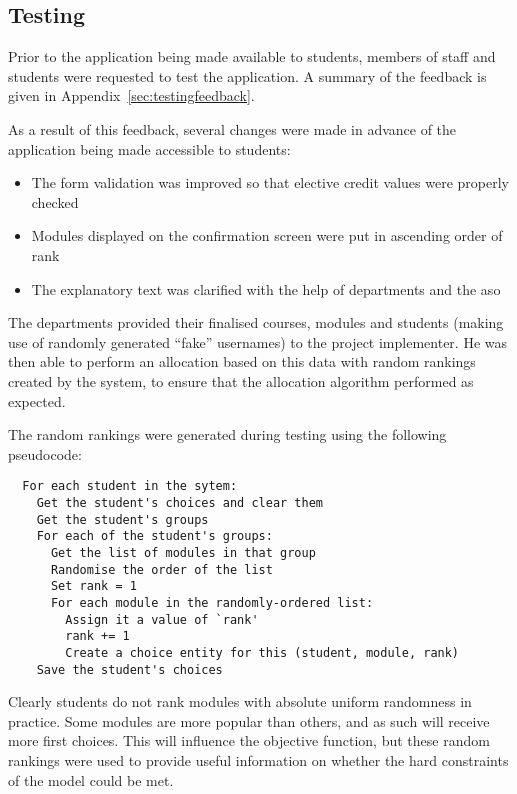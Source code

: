 
\subsection{Testing}



Prior to the application being made available to students, members of staff
and students were requested to test the application. A summary of the feedback
is given in Appendix~\ref{sec:testingfeedback}.

As a result of this feedback, several changes were made in advance of the
application being made accessible to students:

\begin{itemize}
  \item The form validation was improved so that elective credit values were properly checked
  \item Modules displayed on the confirmation screen were put in ascending order of rank
  \item The explanatory text was clarified with the help of departments and the \gls{aso}
\end{itemize}


The departments provided their finalised courses, modules and students (making
use of randomly generated ``fake'' usernames) to the project implementer. He
was then able to perform an allocation based on this data with random rankings
created by the system, to ensure that the allocation algorithm performed as
expected.

The random rankings were generated during testing using the following
pseudocode:

\begin{verbatim}
  For each student in the sytem:
    Get the student's choices and clear them
    Get the student's groups
    For each of the student's groups:
      Get the list of modules in that group
      Randomise the order of the list
      Set rank = 1
      For each module in the randomly-ordered list:
        Assign it a value of `rank'
        rank += 1
        Create a choice entity for this (student, module, rank)
    Save the student's choices
\end{verbatim}

Clearly students do not rank modules with absolute uniform randomness in
practice. Some modules are more popular than others, and as such will receive
more first choices. This will influence the objective function, but these
random rankings were used to provide useful information on whether the hard
constraints of the model could be met.

